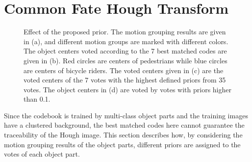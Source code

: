 \documentclass[10pt,twocolumn,letterpaper]{article}
\begin{document}
\section{Common Fate Hough Transform}
\begin{figure}
\centering
{}
\caption{Effect of the proposed prior. The motion grouping results are given in (a), and different motion groups are marked with different colors. The object centers voted according to the 7 best matched codes are given in (b). Red circles are centers of pedestrians while blue circles are centers of bicycle riders. The voted centers given in (c) are the voted centers of the 7 votes with the highest defined priors from 35 votes. The object centers in (d) are voted by votes with priors higher than 0.1.}
\label{fig:compa}
\end{figure}
Since the codebook is trained by multi-class object parts and the training images have a clustered background, the best matched codes here cannot guarantee the traceability of the Hough image. This section describes how, by considering the motion grouping results of the object parts, different priors are assigned to the votes of each object part. 
\end{document}
